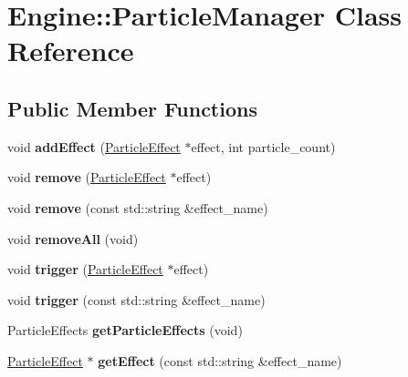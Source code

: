 \hypertarget{classEngine_1_1ParticleManager}{}\section{Engine\+:\+:Particle\+Manager Class Reference}
\label{classEngine_1_1ParticleManager}
\subsection*{Public Member Functions}
\begin{DoxyCompactItemize}
\item 
\hypertarget{classEngine_1_1ParticleManager_af4e8e3bdfea5a45e1f2c9bf6ec7dce0e}{}void {\bfseries add\+Effect} (\hyperlink{classEngine_1_1ParticleEffect}{Particle\+Effect} $\ast$effect, int particle\+\_\+count)\label{classEngine_1_1ParticleManager_af4e8e3bdfea5a45e1f2c9bf6ec7dce0e}

\item 
\hypertarget{classEngine_1_1ParticleManager_a59de97280e9f50e36a84f440a8ee7258}{}void {\bfseries remove} (\hyperlink{classEngine_1_1ParticleEffect}{Particle\+Effect} $\ast$effect)\label{classEngine_1_1ParticleManager_a59de97280e9f50e36a84f440a8ee7258}

\item 
\hypertarget{classEngine_1_1ParticleManager_a46eec3d233c700e30f0aa634ae52ee05}{}void {\bfseries remove} (const std\+::string \&effect\+\_\+name)\label{classEngine_1_1ParticleManager_a46eec3d233c700e30f0aa634ae52ee05}

\item 
\hypertarget{classEngine_1_1ParticleManager_a1a013ffb83f07305275b14c7adf20266}{}void {\bfseries remove\+All} (void)\label{classEngine_1_1ParticleManager_a1a013ffb83f07305275b14c7adf20266}

\item 
\hypertarget{classEngine_1_1ParticleManager_aa1bbafc5b5aef986d9f74d7fb6a0319c}{}void {\bfseries trigger} (\hyperlink{classEngine_1_1ParticleEffect}{Particle\+Effect} $\ast$effect)\label{classEngine_1_1ParticleManager_aa1bbafc5b5aef986d9f74d7fb6a0319c}

\item 
\hypertarget{classEngine_1_1ParticleManager_ad6e84805149854b1622b0f71b5664c52}{}void {\bfseries trigger} (const std\+::string \&effect\+\_\+name)\label{classEngine_1_1ParticleManager_ad6e84805149854b1622b0f71b5664c52}

\item 
\hypertarget{classEngine_1_1ParticleManager_a3ab9fc206bec8e349e810fecf53ab7f2}{}Particle\+Effects {\bfseries get\+Particle\+Effects} (void)\label{classEngine_1_1ParticleManager_a3ab9fc206bec8e349e810fecf53ab7f2}

\item 
\hypertarget{classEngine_1_1ParticleManager_aaa00547e7bd702f2707e1828eb2d77d6}{}\hyperlink{classEngine_1_1ParticleEffect}{Particle\+Effect} $\ast$ {\bfseries get\+Effect} (const std\+::string \&effect\+\_\+name)\label{classEngine_1_1ParticleManager_aaa00547e7bd702f2707e1828eb2d77d6}

\end{DoxyCompactItemize}
